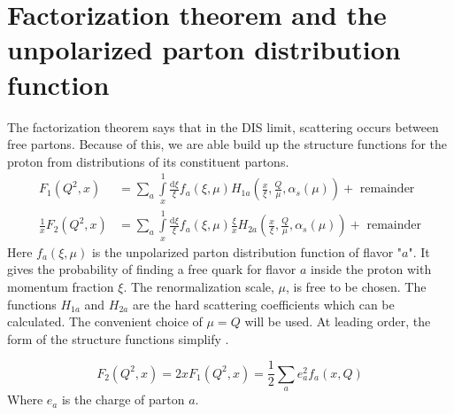 \documentclass[letterpaper, abstract = on,listof=totoc, bibliography=totoc]{scrreprt}
\begin{document}
\section{Factorization theorem and the unpolarized parton distribution function}

The factorization theorem says that in the DIS limit,  scattering occurs between free partons. Because of this, we are able build up the structure functions for the proton from distributions of its constituent partons. 
\begin{eqnarray}
F_1(Q^2,x) &= \sum\limits_a \int\limits_x^1 \frac{\text{d}\xi}{\xi}f_a(\xi,\mu)H_{1a}\left(\frac{x}{\xi},\frac{Q}{\mu}, \alpha_s(\mu)\right) + \text{ remainder}\\
\frac{1}{x}F_2(Q^2,x) &= \sum\limits_a \int\limits_x^1 \frac{\text{d}\xi}{\xi}f_a(\xi,\mu)\frac{\xi}{x}H_{2a}\left(\frac{x}{\xi},\frac{Q}{\mu}, \alpha_s(\mu)\right) + \text{ remainder}
\end{eqnarray} 
Here $f_a(\xi,\mu)$ is the unpolarized parton distribution function of flavor "$a$". It gives the probability of finding a free quark for flavor $a$ inside the proton with momentum fraction $\xi$. The renormalization scale, $\mu$, is free to be chosen. The functions $H_{1a}$ and $H_{2a}$ are the hard scattering coefficients which can be calculated. The convenient choice of $\mu = Q$ will be used.\cite{factorization} At leading order, the form of the structure functions simplify \cite{IEP}.

\begin{equation}
F_2(Q^2,x) = 2x F_1(Q^2,x) = \frac{1}{2}\sum\limits_a e_a ^2 f_a(x, Q)
\end{equation} 
Where $e_a$ is the charge of parton $a$.
\end{document}
